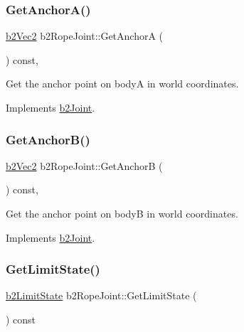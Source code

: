 \subsubsection{\texorpdfstring{GetAnchorA()}{GetAnchorA()}}
{\footnotesize\ttfamily \mbox{\hyperlink{structb2_vec2}{b2\+Vec2}} b2\+Rope\+Joint\+::\+Get\+AnchorA (\begin{DoxyParamCaption}{ }\end{DoxyParamCaption}) const\hspace{0.3cm}{\ttfamily [override]}, {\ttfamily [virtual]}}



Get the anchor point on bodyA in world coordinates. 



Implements \mbox{\hyperlink{classb2_joint_abe46ca3aad5db73909a9b5a7b2117447}{b2\+Joint}}.

\mbox{\label{classb2_rope_joint_a5e1d615b5cff50b367a74e109184e5d5}} 
\subsubsection{\texorpdfstring{GetAnchorB()}{GetAnchorB()}}
{\footnotesize\ttfamily \mbox{\hyperlink{structb2_vec2}{b2\+Vec2}} b2\+Rope\+Joint\+::\+Get\+AnchorB (\begin{DoxyParamCaption}{ }\end{DoxyParamCaption}) const\hspace{0.3cm}{\ttfamily [override]}, {\ttfamily [virtual]}}



Get the anchor point on bodyB in world coordinates. 



Implements \mbox{\hyperlink{classb2_joint_a88e947c65d4ea26fe539f02a8cb7f7a9}{b2\+Joint}}.

\mbox{\label{classb2_rope_joint_ab7b606273b65339f0ab502675f32997e}} 
\subsubsection{\texorpdfstring{GetLimitState()}{GetLimitState()}}
{\footnotesize\ttfamily \mbox{\hyperlink{b2_joint_8h_ae7784edce074221afeb010d638404443}{b2\+Limit\+State}} b2\+Rope\+Joint\+::\+Get\+Limit\+State (\begin{DoxyParamCaption}{ }\end{DoxyParamCaption}) const}

